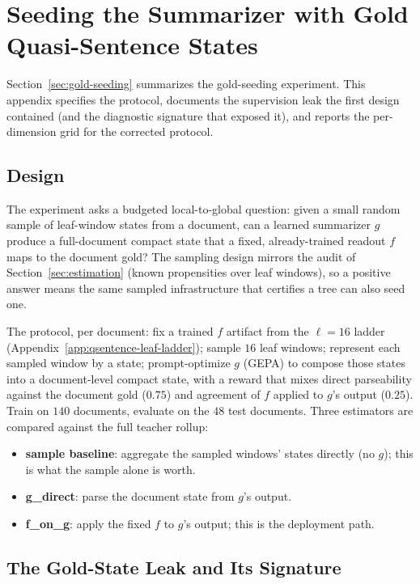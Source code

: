 \section{Seeding the Summarizer with Gold Quasi-Sentence States}\label{app:gold-seeding}

Section~\ref{sec:gold-seeding} summarizes the gold-seeding experiment.
This appendix specifies the protocol, documents the supervision leak
the first design contained (and the diagnostic signature that exposed
it), and reports the per-dimension grid for the corrected protocol.

\subsection{Design}

The experiment asks a budgeted local-to-global question: given a small
random sample of leaf-window states from a document, can a learned
summarizer $g$ produce a full-document compact state that a fixed,
already-trained readout $f$ maps to the document gold? The sampling
design mirrors the audit of Section~\ref{sec:estimation} (known
propensities over leaf windows), so a positive answer means the same
sampled infrastructure that certifies a tree can also seed one.

The protocol, per document: fix a trained $f$ artifact from the
$\ell = 16$ ladder (Appendix~\ref{app:qsentence-leaf-ladder}); sample
$16$ leaf windows; represent each sampled window by a state; prompt-optimize
$g$ (GEPA) to compose those states into a document-level compact state,
with a reward that mixes direct parseability against the document gold
($0.75$) and agreement of $f$ applied to $g$'s output ($0.25$). Train
on $140$ documents, evaluate on the $48$ test documents. Three
estimators are compared against the full teacher rollup:
\begin{itemize}[leftmargin=1.5em]
    \item \textbf{sample baseline}: aggregate the sampled windows'
          states directly (no $g$); this is what the sample alone is
          worth.
    \item \textbf{g\_direct}: parse the document state from $g$'s
          output.
    \item \textbf{f\_on\_g}: apply the fixed $f$ to $g$'s output; this
          is the deployment path.
\end{itemize}

\subsection{The Gold-State Leak and Its Signature}

